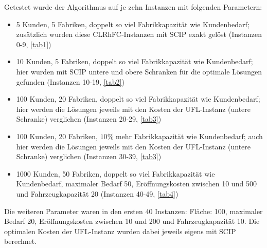 \documentclass[a4paper,ngerman,11pt,bibtotoc]{scrartcl}
\theoremstyle{definition}
\theoremstyle{plain}
\theoremstyle{remark}
\newcommand{\CLRHFC}{CLRhFC}
\newcommand{\UFL}{UFL}
\begin{document}
	Getestet wurde der Algorithmus auf je zehn Instanzen mit folgenden Parametern:
	\begin{itemize}
		\item 5 Kunden, 5 Fabriken, doppelt so viel Fabrikkapazität wie Kundenbedarf; zusätzlich wurden diese \CLRHFC-Instanzen mit SCIP exakt gelöst (Instanzen 0-9, \cref{tab1})
		\item 10 Kunden, 5 Fabriken, doppelt so viel Fabrikkapazität wie Kundenbedarf; hier wurden mit SCIP untere und obere Schranken für die optimale Lösungen gefunden (Instanzen 10-19, \cref{tab2})
		\item 100 Kunden, 20 Fabriken,  doppelt so viel Fabrikkapazität wie Kundenbedarf; hier werden die Lösungen jeweils mit den Kosten der \UFL-Instanz (untere Schranke) verglichen (Instanzen 20-29, \cref{tab3})
		\item 100 Kunden, 20 Fabriken, $10\%$ mehr  Fabrikkapazität wie Kundenbedarf; auch hier werden die Lösungen jeweils mit den Kosten der \UFL-Instanz (untere Schranke) verglichen (Instanzen 30-39, \cref{tab3})
		\item 1000 Kunden, 50 Fabriken, doppelt so viel  Fabrikkapazität wie Kundenbedarf, maximaler Bedarf 50, Eröffnungskosten zwischen 10 und 500 und Fahrzeugkapazität 20 (Instanzen 40-49, \cref{tab4})
	\end{itemize}
	Die weiteren Parameter waren in den ersten 40 Instanzen: Fläche: 100, maximaler Bedarf 20, Eröffnungskosten zwischen 10 und 200 und Fahrzeugkapazität 10. Die optimalen Kosten der \UFL-Instanz wurden dabei jeweils eigens mit SCIP berechnet.
	
\end{document}
